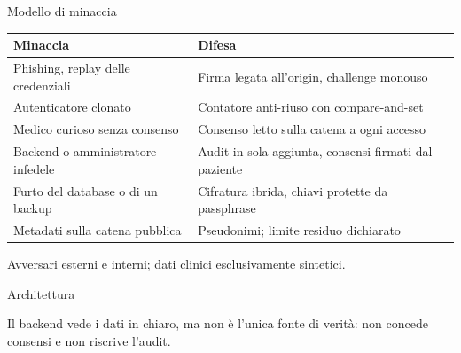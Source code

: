 \documentclass[11pt,aspectratio=169]{beamer}
\begin{document}
\begin{frame}{Modello di minaccia}
\begin{tabular}{@{}p{}p{}@{}}
\toprule
Minaccia & Difesa\\
\midrule
Phishing, replay delle credenziali & Firma legata all'origin, challenge monouso\\
Autenticatore clonato & Contatore anti-riuso con compare-and-set\\
Medico curioso senza consenso & Consenso letto sulla catena a ogni accesso\\
Backend o amministratore infedele & Audit in sola aggiunta, consensi firmati dal paziente\\
Furto del database o di un backup & Cifratura ibrida, chiavi protette da passphrase\\
Metadati sulla catena pubblica & Pseudonimi; limite residuo dichiarato\\
\bottomrule
\end{tabular}

\medskip
\small Avversari esterni e interni; dati clinici esclusivamente sintetici.
\end{frame}

\begin{frame}{Architettura}
\centering
{}

\medskip
\small Il backend vede i dati in chiaro, ma \alert{non è l'unica fonte di verità}: non concede consensi e non riscrive l'audit.
\end{frame}
\end{document}

